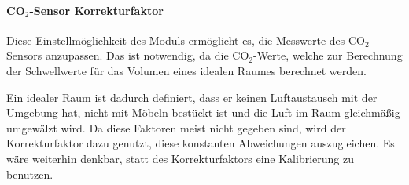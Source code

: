 \paragraph{CO$_2$-Sensor Korrekturfaktor}
Diese Einstellmöglichkeit des Moduls ermöglicht es, die Messwerte des CO$_2$-Sensors anzupassen. Das ist notwendig, da die CO$_2$-Werte, welche zur Berechnung der Schwellwerte für das Volumen eines idealen Raumes berechnet werden.

Ein idealer Raum ist dadurch definiert, dass er keinen Luftaustausch mit der Umgebung hat, nicht mit Möbeln bestückt ist und die Luft im Raum gleichmäßig umgewälzt wird. Da diese Faktoren meist nicht gegeben sind, wird der Korrekturfaktor dazu genutzt, diese konstanten Abweichungen auszugleichen. Es wäre weiterhin denkbar, statt des Korrekturfaktors eine Kalibrierung zu benutzen.

